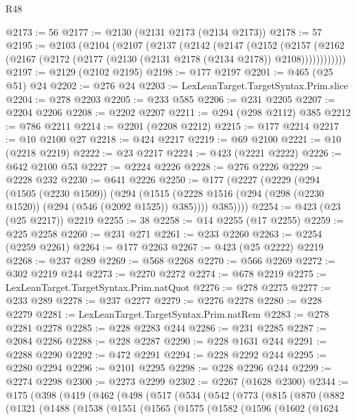 \begin{lexlean}{R48}
\begin{coremodule}
@2173 := 56
@2177 := @2130 (@2131 @2173 (@2134 @2173))
@2178 := 57
@2195 := @2103
    (@2104
      (@2107
        (@2137
          (@2142
            (@2147
              (@2152
                (@2157
                  (@2162 (@2167 (@2172 (@2177 (@2130 (@2131 @2178 (@2134 @2178)) @2108))))))))))))
@2197 := @2129 (@2102 @2195)
@2198 := @177 @2197
@2201 := @465 (@25 @51) @24
@2202 := @276 @24
@2203 := LexLeanTarget.TargetSyntax.Prim.slice
@2204 := @278 @2203
@2205 := @233 @585
@2206 := @231 @2205
@2207 := @2204 @2206
@2208 := @2202 @2207
@2211 := @294 (@298 @2112) @385
@2212 := @786 @2211
@2214 := @2201 (@2208 @2212)
@2215 := @177 @2214
@2217 := @10 @2100 @27
@2218 := @424 @2217
@2219 := @69 @2100
@2221 := @10 (@2218 @2219)
@2222 := @23 @2217
@2224 := @423 (@2221 @2222)
@2226 := @642 @2100 @53
@2227 := @2224 @2226
@2228 := @276 @2226
@2229 := @2228 @232
@2230 := @641 @2226
@2250 := @177
    (@2227
      (@2229
        (@294
          (@1505 (@2230 @1509))
          (@294
            (@1515 (@2228 @1516 (@294 (@298 (@2230 @1520)) (@294 (@546 (@2092 @1525)) @385))))
            @385))))
@2254 := @423 (@23 (@25 @2217)) @2219
@2255 := 38
@2258 := @14 @2255 (@17 @2255)
@2259 := @225 @2258
@2260 := @231 @271
@2261 := @233 @2260
@2263 := @2254 (@2259 @2261)
@2264 := @177 @2263
@2267 := @423 (@25 @2222) @2219
@2268 := @237 @289
@2269 := @568 @2268
@2270 := @566 @2269
@2272 := @302 @2219 @244
@2273 := @2270 @2272
@2274 := @678 @2219
@2275 := LexLeanTarget.TargetSyntax.Prim.natQuot
@2276 := @278 @2275
@2277 := @233 @289
@2278 := @237 @2277
@2279 := @2276 @2278
@2280 := @228 @2279
@2281 := LexLeanTarget.TargetSyntax.Prim.natRem
@2283 := @278 @2281 @2278
@2285 := @228 @2283 @244
@2286 := @231 @2285
@2287 := @2084 @2286
@2288 := @228 @2287
@2290 := @228 @1631 @244
@2291 := @2288 @2290
@2292 := @472 @2291
@2294 := @228 @2292 @244
@2295 := @2280 @2294
@2296 := @2101 @2295
@2298 := @228 @2296 @244
@2299 := @2274 @2298
@2300 := @2273 @2299
@2302 := @2267 (@1628 @2300)
@2344 := @175
    (@398
      (@419
        (@462
          (@498
            (@517
              (@534
                (@542
                  (@773
                    (@815
                      (@870
                        (@882
                          (@1321
                            (@1488
                              (@1538
                                (@1551
                                  (@1565
                                    (@1575
                                      (@1582
                                        (@1596
                                          (@1602
                                            (@1624

\end{coremodule}
\end{lexlean}
